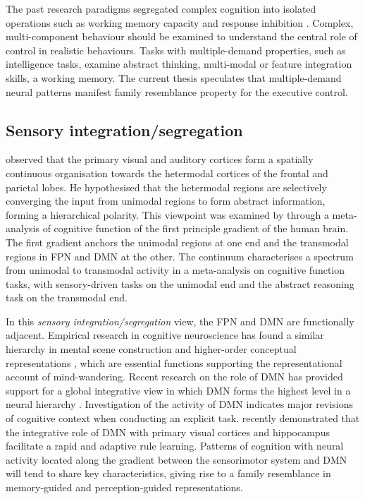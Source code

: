 The past research paradigms segregated complex cognition into isolated operations such as working memory capacity \cite{Vogel2004} and response inhibition \cite{Aron2004}. Complex, multi-component behaviour should be examined to understand the central role of control in realistic behaviours. Tasks with multiple-demand properties, such as intelligence tasks, examine abstract thinking, multi-modal or feature integration skills, a working memory. The current thesis speculates that multiple-demand neural patterns manifest family resemblance property for the executive control. 

\subsection{Sensory integration/segregation}
 observed that the primary visual and auditory cortices form a spatially continuous organisation towards the hetermodal cortices of the frontal and parietal lobes. He hypothesised that the hetermodal regions are selectively converging the input from unimodal regions to form abstract information, forming a hierarchical polarity. This viewpoint was examined by  through a meta-analysis of cognitive function of the first principle gradient of the human brain. The first gradient anchors the unimodal regions at one end and the transmodal regions in FPN and DMN at the other. The continuum characterises a spectrum from unimodal to transmodal activity in a meta-analysis on cognitive function tasks, with sensory-driven tasks on the unimodal end and the abstract reasoning task on the transmodal end.

In this \textit{sensory integration/segregation} view, the FPN and DMN are functionally adjacent. Empirical research in cognitive neuroscience has found a similar hierarchy in mental scene construction \cite{Villena-Gonzalez2018} and higher-order conceptual representations \cite{Murphy2018}, which are essential functions supporting the representational account of mind-wandering. Recent research on the role of DMN has provided support for a global integrative view in which DMN forms the highest level in a neural hierarchy \cite{Margulies2016}. Investigation of the activity of DMN indicates major revisions of cognitive context when conducting an explicit task.  recently demonstrated that the integrative role of DMN with primary visual cortices and hippocampus facilitate a rapid and adaptive rule learning. 
Patterns of cognition with neural activity located along the gradient between the sensorimotor system and DMN will tend to share key characteristics, giving rise to a family resemblance in memory-guided and perception-guided representations.

